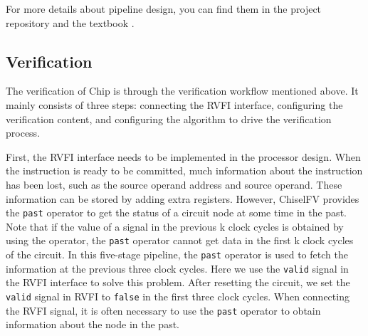 \documentclass[conference]{IEEEtran}
\theoremstyle{definition}
\begin{document}
For more details about pipeline design, you can find them in the project repository \cite{riscvFvChisel} and the textbook \cite{patterson2017computer}.

\subsection{Verification}
The verification of Chip is through the verification workflow mentioned above.
It mainly consists of three steps: connecting the RVFI interface, configuring the verification content, and configuring the algorithm to drive the verification process.

First, the RVFI interface needs to be implemented in the processor design.
When the instruction is ready to be committed, much information about the instruction has been lost, such as the source operand address and source operand.
These information can be stored by adding extra registers.
However, ChiselFV provides the \verb|past| operator to get the status of a circuit node at some time in the past.
Note that if the value of a signal in the previous k clock cycles is obtained by using the operator, the \verb|past| operator cannot get data in the first k clock cycles of the circuit.
In this five-stage pipeline, the \verb|past| operator is used to fetch the information at the previous three clock cycles.
Here we use the \verb|valid| signal in the RVFI interface to solve this problem.
After resetting the circuit, we set the \verb|valid| signal in RVFI to \verb|false| in the first three clock cycles.
When connecting the RVFI signal, it is often necessary to use the \verb|past| operator to obtain information about the node in the past.
\end{document}
